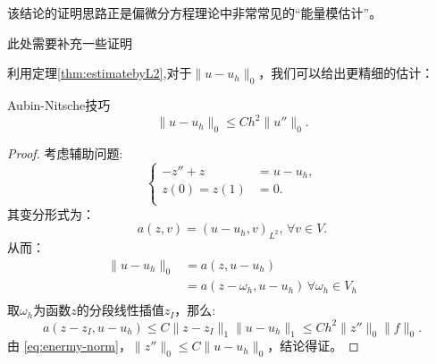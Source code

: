 \documentclass[lang=cn,10pt,newtx]{elegantbook}
\newcommand{\norm}[1]{\|#1\|}
\begin{document}
\begin{remark}
  该结论的证明思路正是偏微分方程理论中非常常见的“能量模估计”。
\end{remark}
\begin{remark}
  此处需要补充一些证明
\end{remark}
利用定理\ref{thm:estimatebyL2},对于$\norm{u-u_{h}}_{0}$，我们可以给出更精细的估计：
\begin{proposition}{Aubin-Nitsche技巧}
  \begin{equation}
    \label{eq:AubinNitsche}
    \norm{u-u_{h}}_{0}\le Ch^{2}\norm{u''}_{0}.
  \end{equation}
\end{proposition}
\begin{proof}
  考虑辅助问题:
  \begin{equation}
    \label{eq:auxiliaryProb}
    \left\{
    \begin{aligned}
        -z''+z&=u-u_{h},\\
        z(0)=z(1)&=0.\\
    \end{aligned}
    \right.
  \end{equation}
  其变分形式为：
  \begin{equation}
    a(z,v)=(u-u_{h},v)_{L^{2}},\,\forall v\in V.
  \end{equation}
  从而：
  \begin{equation}
    \begin{aligned}
      \norm{u-u_{h}}_{0}&=a(z,u-u_{h})\\
      &=a(z-\omega_{h},u-u_{h})\,\forall\omega_{h}\in V_{h}\\
    \end{aligned}
  \end{equation}
  取$\omega_{h}$为函数$z$的分段线性插值$z_{I}$，那么:
  \begin{equation}
    a(z-z_{I},u-u_{h})\le C\norm{z-z_{I}}_{1}\norm{u-u_{h}}_{1}\le Ch^{2}\norm{z''}_{0}\norm{f}_{0}.
  \end{equation}
  由 \eqref{eq:enermy-norm}，$\norm{z''}_{0}\le C\norm{u-u_{h}}_{0}$，结论得证。
\end{proof}
\end{document}
